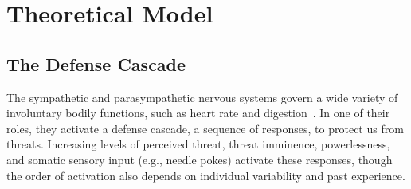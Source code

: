 \documentclass[11pt,oneside]{book}
\let\cite\parencite
\begin{document}
\chapter{Theoretical Model}
\label{science}
\section{The Defense Cascade}
\label{sec:defensecascade}
The sympathetic and parasympathetic nervous systems govern a wide variety of involuntary bodily functions, such as heart rate and digestion~\cite{kozlowskaDefenseCascade}. In one of their roles, they activate a defense cascade, a sequence of responses, to protect us from threats. Increasing levels of perceived threat, threat imminence, powerlessness, and somatic sensory input (e.g., needle pokes) activate these responses, though the order of activation also depends on individual variability and past experience.
\end{document}
